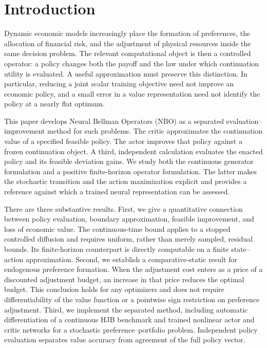 \section{Introduction}
Dynamic economic models increasingly place the formation of preferences, the allocation of financial risk, and the adjustment of physical resources inside the same decision problem. The relevant computational object is then a controlled operator: a policy changes both the payoff and the law under which continuation utility is evaluated. A useful approximation must preserve this distinction. In particular, reducing a joint scalar training objective need not improve an economic policy, and a small error in a value representation need not identify the policy at a nearly flat optimum.

This paper develops Neural Bellman Operators (NBO) as a separated evaluation--improvement method for such problems. The critic approximates the continuation value of a specified feasible policy. The actor improves that policy against a frozen continuation object. A third, independent calculation evaluates the enacted policy and its feasible deviation gains. We study both the continuous generator formulation and a positive finite-horizon operator formulation. The latter makes the stochastic transition and the action maximization explicit and provides a reference against which a trained neural representation can be assessed.

There are three substantive results. First, we give a quantitative connection between policy evaluation, boundary approximation, feasible improvement, and loss of economic value. The continuous-time bound applies to a stopped controlled diffusion and requires uniform, rather than merely sampled, residual bounds. Its finite-horizon counterpart is directly computable on a finite state--action approximation. Second, we establish a comparative-static result for endogenous preference formation. When the adjustment cost enters as a price of a discounted adjustment budget, an increase in that price reduces the optimal budget. This conclusion holds for any optimizers and does not require differentiability of the value function or a pointwise sign restriction on preference adjustment. Third, we implement the separated method, including automatic differentiation of a continuous HJB benchmark and trained nonlinear actor and critic networks for a stochastic preference--portfolio problem. Independent policy evaluation separates value accuracy from agreement of the full policy vector.


